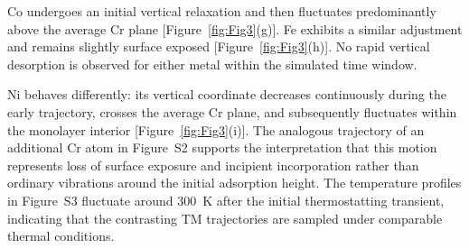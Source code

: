 \documentclass[journal=jacsat,manuscript=article]{achemso}
\begin{document}
Co undergoes an initial vertical relaxation and then fluctuates predominantly above the average Cr plane [Figure~\ref{fig:Fig3}(g)]. Fe exhibits a similar adjustment and remains slightly surface exposed [Figure~\ref{fig:Fig3}(h)]. No rapid vertical desorption is observed for either metal within the simulated time window.

Ni behaves differently: its vertical coordinate decreases continuously during the early trajectory, crosses the average Cr plane, and subsequently fluctuates within the monolayer interior [Figure~\ref{fig:Fig3}(i)]. The analogous trajectory of an additional Cr atom in Figure~S2 supports the interpretation that this motion represents loss of surface exposure and incipient incorporation rather than ordinary vibrations around the initial adsorption height. The temperature profiles in Figure~S3 fluctuate around 300~K after the initial thermostatting transient, indicating that the contrasting TM trajectories are sampled under comparable thermal conditions.
\end{document}
